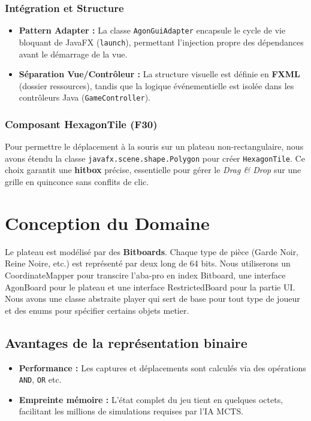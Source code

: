 \documentclass[9pt]{extarticle} %
\begin{document}
\subsubsection{Intégration et Structure}
\begin{itemize}
    \item \textbf{Pattern Adapter :} La classe \texttt{AgonGuiAdapter} encapsule le cycle de vie bloquant de JavaFX (\texttt{launch}), permettant l'injection propre des dépendances avant le démarrage de la vue.
    \item \textbf{Séparation Vue/Contrôleur :} La structure visuelle est définie en \textbf{FXML} (dossier ressources), tandis que la logique événementielle est isolée dans les contrôleurs Java (\texttt{GameController}).
\end{itemize}


\subsubsection{Composant HexagonTile (F30)}
Pour permettre le déplacement à la souris sur un plateau non-rectangulaire, nous avons étendu la classe \texttt{javafx.scene.shape.Polygon} pour créer \texttt{HexagonTile}.
Ce choix garantit une \textbf{hitbox} précise, essentielle pour gérer le \textit{Drag \& Drop} sur une grille en quinconce sans conflits de clic.

\section{Conception du Domaine}
Le plateau est modélisé par des \textbf{Bitboards}. Chaque type de pièce (Garde Noir, Reine Noire, etc.) est représenté par deux long de 64 bits. Nous utiliserons un CoordinateMapper pour transcire l'aba-pro en index Bitboard, une interface AgonBoard pour le plateau et une interface RestrictedBoard pour la partie UI. Nous avons une classe abstraite player qui sert de base pour tout type de joueur et des enums pour spécifier certains objets metier.

\subsection{Avantages de la représentation binaire}
\begin{itemize}
    \item \textbf{Performance :} Les captures et déplacements sont calculés via des opérations \texttt{AND}, \texttt{OR} etc.
    \item \textbf{Empreinte mémoire :} L'état complet du jeu tient en quelques octets, facilitant les millions de simulations requises par l'IA MCTS.
\end{itemize}
\end{document}
